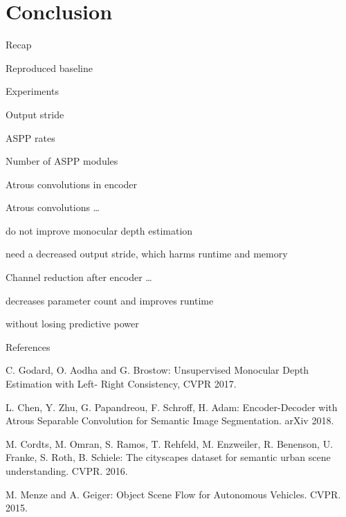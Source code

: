 \documentclass[11pt]{beamer}
\newenvironment{wideitemize}{\itemize\addtolength{\itemsep}{.75em}}{\enditemize}
\newcommand{\addsubitemspace}{\vspace{0.5em}}
\begin{document}
\section{Conclusion}
\begin{frame}[c]{Recap}
  \begin{wideitemize}
  \item Reproduced baseline
  \item Experiments
  \vspace{0.75em}
  \begin{wideitemize}
  \item Output stride
  \item ASPP rates
  \item Number of ASPP modules
  \item Atrous convolutions in encoder
  \end{wideitemize}
  \end{wideitemize}
\end{frame}
\begin{frame}[c]{\secname}
    \begin{wideitemize}
      \item Atrous convolutions \dots
      \addsubitemspace
      \begin{wideitemize}
      \item do not improve monocular depth estimation
      \item need a decreased output stride, which harms runtime and memory
      \end{wideitemize}
  \item Channel reduction after encoder \dots
  \addsubitemspace
  \begin{wideitemize}
  \item decreases parameter count and improves runtime
  \item without losing predictive power
  \end{wideitemize}
  \end{wideitemize}
\end{frame}

\begin{frame}[c]{References}
    \begin{wideitemize}
    \item C. Godard, O. Aodha and G. Brostow: Unsupervised Monocular Depth Estimation with Left- Right Consistency, CVPR 2017.
    \item L. Chen, Y. Zhu, G. Papandreou, F. Schroff, H. Adam: Encoder-Decoder with Atrous Separable Convolution for Semantic Image Segmentation. arXiv 2018.
    \item M. Cordts, M. Omran, S. Ramos, T. Rehfeld, M. Enzweiler, R. Benenson, U. Franke, S. Roth, B. Schiele: The cityscapes dataset for semantic urban scene understanding. CVPR. 2016.
    \item M. Menze and A. Geiger: Object Scene Flow for Autonomous Vehicles. CVPR. 2015. 
    \end{wideitemize}
\end{frame}




% 
% 
\end{document}
